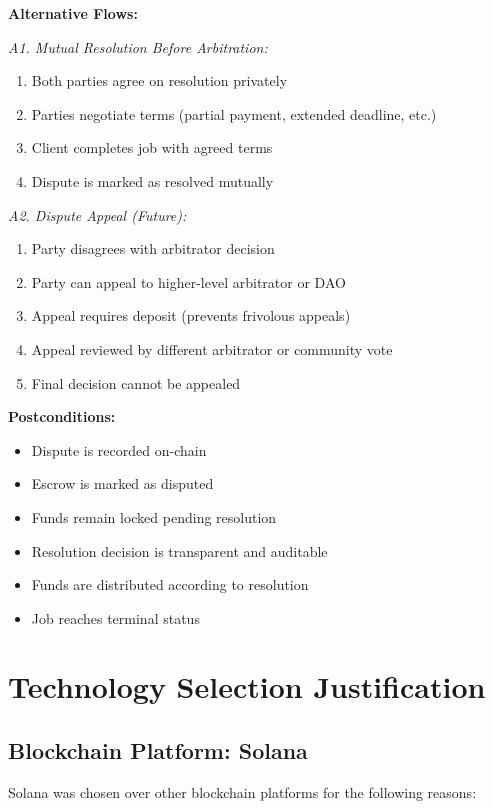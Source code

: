 \documentclass[a4paper,13pt,twoside]{report}
\theoremstyle{definition}
\begin{document}
\textbf{Alternative Flows:}

\textit{A1. Mutual Resolution Before Arbitration:}
\begin{enumerate}
    \item Both parties agree on resolution privately
    \item Parties negotiate terms (partial payment, extended deadline, etc.)
    \item Client completes job with agreed terms
    \item Dispute is marked as resolved mutually
\end{enumerate}

\textit{A2. Dispute Appeal (Future):}
\begin{enumerate}
    \item Party disagrees with arbitrator decision
    \item Party can appeal to higher-level arbitrator or DAO
    \item Appeal requires deposit (prevents frivolous appeals)
    \item Appeal reviewed by different arbitrator or community vote
    \item Final decision cannot be appealed
\end{enumerate}

\textbf{Postconditions:}
\begin{itemize}
    \item Dispute is recorded on-chain
    \item Escrow is marked as disputed
    \item Funds remain locked pending resolution
    \item Resolution decision is transparent and auditable
    \item Funds are distributed according to resolution
    \item Job reaches terminal status
\end{itemize}

\section{Technology Selection Justification}

\subsection{Blockchain Platform: Solana}

Solana was chosen over other blockchain platforms for the following reasons:
\end{document}
